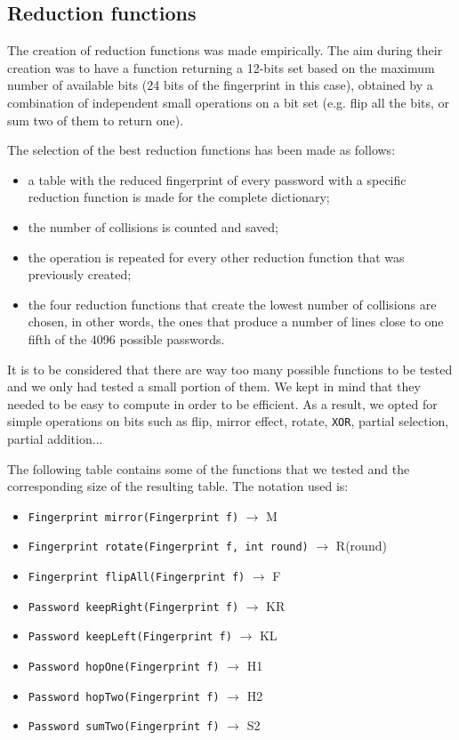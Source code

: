 \documentclass[a4paper,11pt]{article}
\begin{document}
\subsection{Reduction functions}
The creation of reduction functions was made empirically. 
The aim during their creation was to have a function returning a 12-bits set based on the maximum number of available bits (24 bits of the fingerprint in this case), obtained by a combination of independent small operations on a bit set (e.g. flip all the bits, or sum two of them to return one).

The selection of the best reduction functions has been made as follows:
\begin{itemize}
\item a table with the reduced fingerprint of every password with a specific reduction function is made for the complete dictionary;
\item the number of collisions is counted and saved;
\item the operation is repeated for every other reduction function that was previously created;
\item the four reduction functions that create the lowest number of collisions are chosen, in other words, the ones that produce a number of lines close to one fifth of the 4096 possible passwords.
\end{itemize}
It is to be considered that there are way too many possible functions to be tested and we only had tested a small portion of them. We kept in mind that they needed to be easy to compute in order to be efficient. As a result, we opted for simple operations on bits such as flip, mirror effect, rotate, \texttt{XOR}, partial selection, partial addition...

The following table contains some of the functions that we tested and the corresponding size of the resulting table. The notation used is:
\begin{itemize}
\item \texttt{Fingerprint mirror(Fingerprint f)} $\rightarrow$ M
\item \texttt{Fingerprint rotate(Fingerprint f, int round)} $\rightarrow$ R(round)
\item \texttt{Fingerprint flipAll(Fingerprint f)} $\rightarrow$ F
\item \texttt{Password keepRight(Fingerprint f)} $\rightarrow$ KR
\item \texttt{Password keepLeft(Fingerprint f)} $\rightarrow$ KL
\item \texttt{Password hopOne(Fingerprint f)} $\rightarrow$ H1
\item \texttt{Password hopTwo(Fingerprint f)} $\rightarrow$ H2
\item \texttt{Password sumTwo(Fingerprint f)} $\rightarrow$ S2
\end{itemize}
\end{document}
